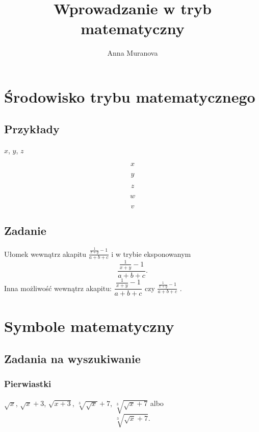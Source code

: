 \documentclass[a4paper, 12pt]{amsart}
\author[A. Muranova]{Anna Muranova}
\title{Wprowadzanie w tryb matematyczny}
\begin{document}
\maketitle


\section{Środowisko trybu matematycznego}
\subsection{Przykłady}

\(x\), $y$, \begin{math} z\end{math}

$$x$$

\[y\]

\begin{displaymath} z\end{displaymath}

\begin{equation} w \end{equation}

\begin{equation*} v \end{equation*}



\subsection{Zadanie}
Ułomek wewnątrz akapitu $\frac{\frac{1}{x+y}-1}{a+b+c}$ i w trybie eksponowanym
\begin{displaymath}
\frac{\frac{1}{x+y}-1}{a+b+c}.
\end{displaymath}
Inna możliwość  wewnątrz akapitu: $\dfrac{\frac{1}{x+y}-1}{a+b+c}$ czy $\displaystyle \frac{\frac{1}{x+y}-1}{a+b+c}$ .




\section{Symbole matematyczny}
\subsection{Zadania na wyszukiwanie}
\subsubsection{Pierwiastki}
$\sqrt{x}$, $\sqrt{x}+3$, $\sqrt{x+3}$, $\sqrt[3]{\sqrt{x}}+7$, $\sqrt[3]{\sqrt{x}+7}$ albo
\begin{equation*} 
\sqrt[3]{\sqrt{x}+7}.
\end{equation*} 
\end{document}
